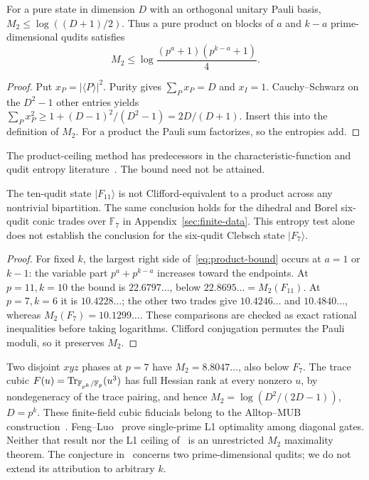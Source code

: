 \begin{lemma}\label{lem:product-ceiling}
For a pure state in dimension $D$ with an orthogonal unitary Pauli basis,
$M_2\leq\log((D+1)/2)$. Thus a pure product on blocks of $a$ and $k-a$
prime-dimensional qudits satisfies
\begin{equation}\label{eq:product-bound}
 M_2\leq\log\frac{(p^a+1)(p^{k-a}+1)}4.
\end{equation}
\end{lemma}
\begin{proof}
Put $x_P=|\langle P\rangle|^2$. Purity gives $\sum_Px_P=D$ and
$x_I=1$. Cauchy--Schwarz on the $D^2-1$ other entries yields
$\sum_Px_P^2\geq1+(D-1)^2/(D^2-1)=2D/(D+1)$.
Insert this into the definition of $M_2$. For a product the Pauli sum
factorizes, so the entropies add.
\end{proof}
The product-ceiling method has predecessors in the characteristic-function
and qudit entropy literature~\cite{dai,wangli}. The bound need not be attained.

\begin{corollary}\label{cor:product-exclusion}
The ten-qudit state $|F_{11}\rangle$ is not Clifford-equivalent to a product
across any nontrivial bipartition. The same conclusion holds for the dihedral
and Borel six-qudit conic trades over $\mathbb F_7$ in
Appendix~\ref{sec:finite-data}. This entropy test alone does not establish
the conclusion for the six-qudit Clebsch state $|F_7\rangle$.
\end{corollary}
\begin{proof}
For fixed $k$, the largest right side of~\eqref{eq:product-bound} occurs at
$a=1$ or $k-1$: the variable part $p^a+p^{k-a}$ increases toward the
endpoints. At $p=11,k=10$ the bound is $22.6797\ldots$, below
$22.8695\ldots=M_2(F_{11})$. At $p=7,k=6$ it is $10.4228\ldots$;
the other two trades give $10.4246\ldots$ and $10.4840\ldots$, whereas
$M_2(F_7)=10.1299\ldots$. These comparisons are checked as exact rational
inequalities before taking logarithms. Clifford conjugation permutes the
Pauli moduli, so it preserves $M_2$.
\end{proof}

Two disjoint $xyz$ phases at $p=7$ have
$M_2=8.8047\ldots$, also below $F_7$.
The trace cubic $F(u)=\operatorname{Tr}_{\mathbb F_{p^k}/\mathbb F_p}(u^3)$ has full Hessian rank
at every nonzero $u$, by nondegeneracy of the trace pairing, and hence
$M_2=\log(D^2/(2D-1))$, $D=p^k$. These finite-field cubic fiducials belong
to the Alltop--MUB construction~\cite{alltop,klappenecker,damski}.
Feng--Luo~\cite[Proposition 2 and Appendix C]{feng} prove single-prime
L1 optimality among diagonal gates. Neither that result nor the L1 ceiling
of~\cite{damski} is an unrestricted $M_2$ maximality theorem.
The conjecture in~\cite{knipfer} concerns two prime-dimensional qudits;
we do not extend its attribution to arbitrary $k$.
